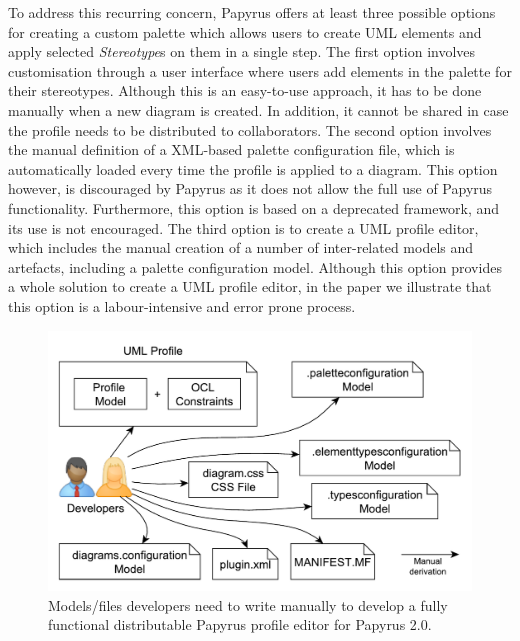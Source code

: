 To address this recurring concern, Papyrus offers at least three possible options for creating a custom palette which allows users to create UML elements and apply selected \textit{Stereotype}s on them in a single step. 
The first option involves customisation through a user interface where users add elements in the palette for their stereotypes. 
Although this is an easy-to-use approach, it has to be done manually when a new diagram is created. 
In addition, it cannot be shared in case the profile needs to be distributed to collaborators. 
The second option involves the manual definition of a XML-based palette configuration file, which is automatically loaded every time the profile is applied to a diagram. 
This option however, is discouraged by Papyrus as it does not allow the full use of Papyrus functionality.
Furthermore, this option is based on a deprecated framework, and its use is not encouraged.  
The third option is to create a UML profile editor, which includes the manual creation of a number of inter-related models and artefacts, including a palette configuration model. 
Although this option provides a whole solution to create a UML profile editor, in the paper we illustrate that this option is a labour-intensive and error prone process.

\begin{figure}[ht]
	\centering
	\includegraphics[width=1\textwidth]{diagrams/neededPapyrusFiles.pdf}
	\vspace{-3mm}
	\caption[]{Models/files developers need to write manually to 
		develop a fully functional distributable Papyrus profile editor for Papyrus 2.0.}
	\label{fig:neededPapyrusFiles}
\end{figure}

